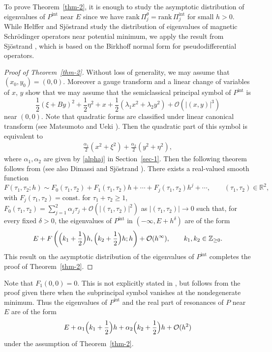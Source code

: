 \documentclass{article}
\theoremstyle{plain}
\theoremstyle{definition}
\theoremstyle{remark}
\begin{document}
To prove Theorem~\ref{thm-2}, 
it is enough to study the asymptotic distribution of eigenvalues of $P^{\mathrm{int}}$ near $E$
since we have $\mathrm{rank}\,\Pi_j^{\theta}=\mathrm{rank}\,\Pi_j^{\mathrm{int}}$ for small $h>0$. 
 While Helffer and Sj\"ostrand \cite{HeSjo2} study the distribution of eigenvalues of magnetic 
Schr\"{o}dinger operators near potential minimum, we apply the result from Sj\"ostrand \cite{Sj}, 
which is based on the Birkhoff normal form for pseudodifferential operators. 

\begin{proof}[Proof of Theorem~\ref{thm-2}]
Without loss of generality, we may assume that $(x_0, y_0)=(0, 0)$. 
Moreover a gauge transform and a linear change of variables of $x$, $y$ show that 
we may assume that 
the semiclassical principal symbol of $P^{\mathrm{int}}$ is 
\[
\frac{1}{2}(\xi+By)^2+\frac{1}{2}\eta^2+x+\frac{1}{2}(\lambda_1 x^2+\lambda_2 y^2)+\mathcal{O}(|(x, y)|^3) 
\]
near $(0, 0)$. 
Note that quadratic forms are classified under linear canonical transform (see Matsumoto and Ueki \cite{MU1}). 
Then the quadratic part of this symbol is equivalent to 
\begin{align*}
\frac{\alpha_1}{2}(x^2+\xi^2)+\frac{\alpha_2}{2}(y^2+\eta^2), 
\end{align*}
where $\alpha_1,\alpha_2$ are given by \eqref{alphaj} in Section~\ref{sec-1}. 
Then the following theorem follows from \cite{Sj} (see also Dimassi and Sj\"{o}strand \cite[Chapter~14]{DS}). 
There exists a real-valued smooth function
$$
F(\tau_1,\tau_2;h)\sim F_0(\tau_1,\tau_2)+F_1(\tau_1,\tau_2)h+\cdots+F_j(\tau_1,\tau_2)h^{j}+\cdots,\qquad (\tau_1,\tau_2)\in\mathbb{R}^2,
$$
with $F_j(\tau_1,\tau_2)=\mathrm{const.}$ for $\tau_1+\tau_2\ge 1$, 
$F_0(\tau_1,\tau_2)=\sum_{j=1}^2 \alpha_j\tau_j+\mathcal{O}(|(\tau_1,\tau_2)|^2)$ as $|(\tau_1,\tau_2)|\to 0$
such that, for every fixed $\delta>0$, the eigenvalues of $P^{\mathrm{int}}$ in $(-\infty, E+h^{\delta})$
are of the form
$$
E+F\left(\Bigl(k_1+\frac12\Bigr)h,\Bigl(k_2+\frac12\Bigr)h;h\right)+\mathcal{O}(h^{\infty}),
\qquad k_1,k_2\in\mathbb{Z}_{\ge 0}.
$$
This result on the asymptotic distribution of the eigenvalues of $P^{\mathrm{int}}$ completes the proof of 
Theorem~\ref{thm-2}.
\end{proof}
Note that $F_1(0, 0)=0$.  
This is not explicitly stated in \cite{DS}, but follows from the proof given there when the subprincipal symbol vanishes 
at the nondegenerate minimum. Thus the eigenvalues of $P^{\mathrm{int}}$ and 
the real part of resonances of $P$ near $E$ are of the form 
\[
E+\alpha_1\Bigl(k_1+\frac12\Bigr)h+\alpha_2\Bigl(k_2+\frac12\Bigr)h+\mathcal{O}(h^2)
\]
under the assumption of Theorem~\ref{thm-2}. 
\end{document}
